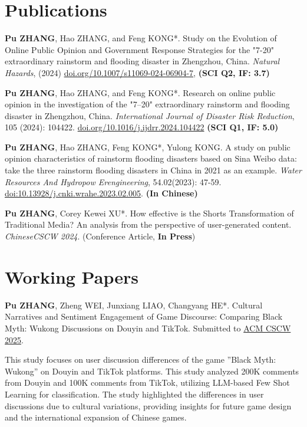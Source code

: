 \documentclass[letterpaper, 11pt]{article}
\begin{document}
\section{Publications}
\textbf{Pu ZHANG}, Hao ZHANG, and Feng KONG*. Study on the Evolution of Online Public Opinion and Government Response Strategies for the "7-20" extraordinary rainstorm and flooding disaster in Zhengzhou, China. \textit{Natural Hazards}, (2024) \href{https://doi.org/10.1007/s11069-024-06904-7}{doi.org/10.1007/s11069-024-06904-7}, \textbf{(SCI Q2, IF: 3.7)}

\vspace{0.5em}
\textbf{Pu ZHANG}, Hao ZHANG, and Feng KONG*. Research on online public opinion in the investigation of the "7–20" extraordinary rainstorm and flooding disaster in Zhengzhou, China. \textit{International Journal of Disaster Risk Reduction}, {105 (2024): 104422.} \href{https://doi.org/10.1016/j.ijdrr.2024.104422}{doi.org/10.1016/j.ijdrr.2024.104422} \textbf{(SCI Q1, IF: 5.0)}    

\vspace{0.5em}
\textbf{Pu ZHANG}, Hao ZHANG, Feng KONG*, Yulong KONG. {A study on public opinion characteristics of rainstorm flooding disasters based on Sina Weibo data: take the three rainstorm flooding disasters in China in 2021 as an example}. \textit{Water Resources And Hydropow Erengineering}, {54.02(2023): 47-59}. \href{https://doi.org/10.13928/j.cnki.wrahe.2023.02.005}{doi:10.13928/j.cnki.wrahe.2023.02.005}. \textbf{(In Chinese)}

\vspace{0.5em}
\textbf{Pu ZHANG}, Corey Kewei XU*. How effective is the Shorts Transformation of Traditional Media? An analysis from the perspective of user-generated content. \textit{ChineseCSCW 2024}. (Conference Article, \textbf{In Press})

\section{Working Papers}
\textbf{Pu ZHANG}, Zheng WEI, Junxiang LIAO, Changyang HE*. Cultural Narratives and Sentiment Engagement of Game Discourse: Comparing Black Myth: Wukong Discussions on Douyin and TikTok. Submitted to \href{https://cscw.acm.org/2025/}{ACM CSCW 2025}.

This study focuses on user discussion differences of the game ''Black Myth: Wukong'' on Douyin and TikTok platforms. This study analyzed 200K comments from Douyin and 100K comments from TikTok, utilizing LLM-based Few Shot Learning for classification. The study highlighted the differences in user discussions due to cultural variations, providing insights for future game design and the international expansion of Chinese games.
\end{document}
